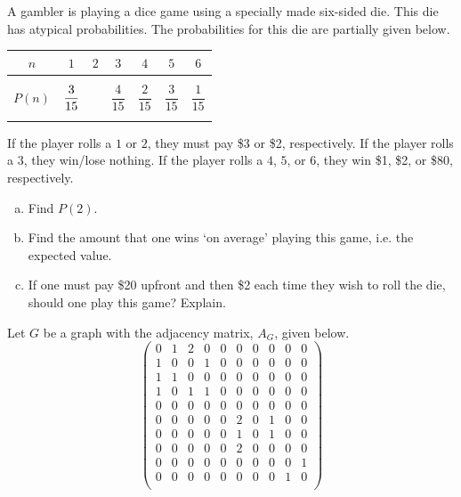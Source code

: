 \documentclass[12pt,letterpaper]{exam}
\begin{document}
\begin{questions}
\newpage
\question[10] A gambler is playing a dice game using a specially made six-sided die. This die has atypical probabilities. The probabilities for this die are partially given below. \par
	\begin{table}[!ht]
	\centering 
	\begin{tabular}{|c||c|c|c|c|c|c|} \hline 
	$n$ & $1$ & $2$ & $3$ & $4$ & $5$ & $6$ \\ \hline 
	$P(n)$ & $\dfrac{3\rule{0pt}{2.9ex}}{15\rule[-1.3ex]{0pt}{0pt}}$ & \phantom{$\dfrac{00}{00}$} & $\dfrac{4}{15}$ & $\dfrac{2}{15}$ & $\dfrac{3}{15}$ & $\dfrac{1}{15}$ \\ \hline 
	\end{tabular}
	\end{table} \par
If the player rolls a $1$ or $2$, they must pay \$3 or \$2, respectively. If the player rolls a $3$, they win/lose nothing. If the player rolls a $4$, $5$, or $6$, they win \$1, \$2, or \$80, respectively. 
        \begin{enumerate}[(a)]
        \item Find $P(2)$. 
        \item Find the amount that one wins `on average' playing this game, i.e. the expected value. 
        \item If one must pay \$20 upfront and then \$2 each time they wish to roll the die, should one play this game? Explain. 
        \end{enumerate}



\newpage



\newpage
\question[10] Let $G$ be a graph with the adjacency matrix, $A_G$, given below.
	\[
	\begin{pmatrix}
	0 & 1 & 2 & 0 & 0 & 0 & 0 & 0 & 0 & 0 \\
	1 & 0 & 0 & 1 & 0 & 0 & 0 & 0 & 0 & 0 \\
	1 & 1 & 0 & 0 & 0 & 0 & 0 & 0 & 0 & 0 \\
	1 & 0 & 1 & 1 & 0 & 0 & 0 & 0 & 0 & 0 \\
	0 & 0 & 0 & 0 & 0 & 0 & 0 & 0 & 0 & 0 \\
	0 & 0 & 0 & 0 & 0 & 2 & 0 & 1 & 0 & 0 \\
	0 & 0 & 0 & 0 & 0 & 1 & 0 & 1 & 0 & 0 \\
	0 & 0 & 0 & 0 & 0 & 2 & 0 & 0 & 0 & 0 \\
	0 & 0 & 0 & 0 & 0 & 0 & 0 & 0 & 0 & 1 \\
	0 & 0 & 0 & 0 & 0 & 0 & 0 & 0 & 1 & 0 \\
	\end{pmatrix}
	\]


\end{questions}
\end{document}
